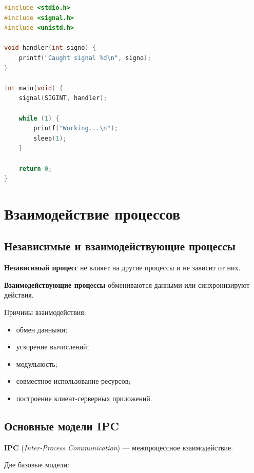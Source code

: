 \documentclass[12pt,a4paper]{article}
\begin{document}
\begin{lstlisting}[language=C]
#include <stdio.h>
#include <signal.h>
#include <unistd.h>

void handler(int signo) {
    printf("Caught signal %d\n", signo);
}

int main(void) {
    signal(SIGINT, handler);

    while (1) {
        printf("Working...\n");
        sleep(1);
    }

    return 0;
}
\end{lstlisting}

\section{Взаимодействие процессов}

\subsection{Независимые и взаимодействующие процессы}

\textbf{Независимый процесс} не влияет на другие процессы и не зависит от них.

\textbf{Взаимодействующие процессы} обмениваются данными или синхронизируют действия.

Причины взаимодействия:
\begin{itemize}
    \item обмен данными;
    \item ускорение вычислений;
    \item модульность;
    \item совместное использование ресурсов;
    \item построение клиент-серверных приложений.
\end{itemize}

\subsection{Основные модели IPC}

\textbf{IPC} (\textit{Inter-Process Communication}) --- межпроцессное взаимодействие.

Две базовые модели:
\end{document}
